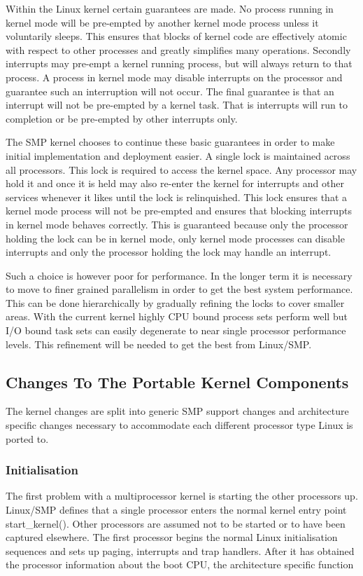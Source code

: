 \documentclass[]{article}
\begin{document}
Within the Linux kernel certain guarantees are made. No process running in 
kernel mode will be pre-empted by another kernel mode process unless it 
voluntarily sleeps.  This ensures that blocks of kernel code are 
effectively atomic with respect to other processes and greatly simplifies 
many operations. Secondly interrupts may pre-empt a kernel running process, 
but will always return to that process. A process in kernel mode may 
disable interrupts on the processor and guarantee such an interruption will 
not occur. The final guarantee is that an interrupt will not be pre-empted 
by a kernel task. That is interrupts will run to completion or be 
pre-empted by other interrupts only.

The SMP kernel chooses to continue these basic guarantees in order to make 
initial implementation and deployment easier.  A single lock is maintained 
across all processors. This lock is required to access the kernel space. 
Any processor may hold it and once it is held may also re-enter the kernel 
for interrupts and other services whenever it likes until the lock is 
relinquished. This lock ensures that a kernel mode process will not be 
pre-empted and ensures that blocking interrupts in kernel mode behaves 
correctly. This is guaranteed because only the processor holding the lock 
can be in kernel mode, only kernel mode processes can disable interrupts 
and only the processor holding the lock may handle an interrupt.

Such a choice is however poor for performance. In the longer term it is 
necessary to move to finer grained parallelism in order to get the best 
system performance. This can be done hierarchically by gradually refining 
the locks to cover smaller areas. With the current kernel highly CPU bound 
process sets perform well but I/O bound task sets can easily degenerate to 
near single processor performance levels. This refinement will be needed to 
get the best from Linux/SMP.

\subsection{Changes To The Portable Kernel Components}
The kernel changes are split into generic SMP support changes and 
architecture specific changes necessary to accommodate each different 
processor type Linux is ported to.


\subsubsection{Initialisation}
The first problem with a multiprocessor kernel is starting the other 
processors up. Linux/SMP defines that a single processor enters the normal 
kernel entry point start\_kernel(). Other processors are assumed not to be 
started or to have been captured elsewhere. The first processor begins the 
normal Linux initialisation sequences and sets up paging, interrupts and 
trap handlers. After it has obtained the processor information about the 
boot CPU, the architecture specific function 
\end{document}
